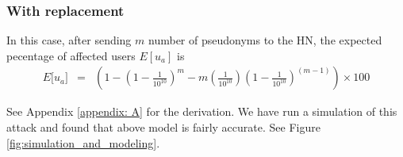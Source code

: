 \documentclass{llncs} %
\begin{document}
\subsubsection{With replacement}
In this case, after sending $m$ number of pseudonyms to the HN, the expected pecentage of affected users $E[u_a]$ is
\begin{eqnarray}
E\big[ u_a \big] &=& \left(1- \left(1 - \frac{1}{10^{10}}\right)^m - m\left(\frac{1}{10^{10}}\right)\left(1 - \frac{1}{10^{10}}\right)^{\left(m-1 \right)} \right) \times 100 \label{eqn:avg_with_replacement}
\end{eqnarray} 

See Appendix \ref{appendix: A} for the derivation. We have run a simulation of this attack and found that above model is fairly accurate. See Figure \ref{fig:simulation_and_modeling}.
\end{document}
